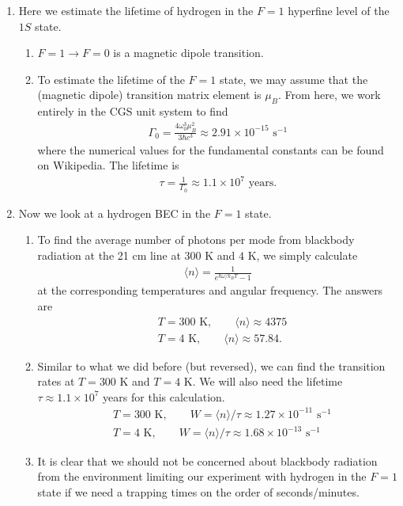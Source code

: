 \documentclass{article}
\theoremstyle{definition}
\newcommand{\f}[2]{\frac{#1}{#2}}
\begin{document}
\begin{enumerate}[label=(\alph*)]
	\item Here we estimate the lifetime of hydrogen in the $F=1$ hyperfine level of the $1S$ state. 
	
	\begin{enumerate}[label=(\roman*)]
		\item $F=1 \to F=0$ is a magnetic dipole transition. 
		
		\item To estimate the lifetime of the $F=1$ state, we may assume that the (magnetic dipole) transition matrix element is $\mu_B$. From here, we work entirely in the CGS unit system to find 
		\begin{align*}
		\Gamma_0 = \f{4\omega_0^3 \mu_B^2}{3\hbar c^3} \approx 2.91 \times 10^{-15} \text{ s}^{-1}
		\end{align*}
		where the numerical values for the fundamental constants can be found on Wikipedia. The lifetime is 
		\begin{align*}
		\tau = \f{1}{\Gamma_0} \approx 1.1 \times 10^7 \text{ years}.
		\end{align*}
		
		
	\end{enumerate}
	
	\item Now we look at a hydrogen BEC in the $F=1$ state. 
	
	\begin{enumerate}[label=(\roman*)]
		\item To find the average number of photons per mode from blackbody radiation at the 21 cm line at $300$ K and $4$ K, we simply calculate
		\begin{align*}
		\langle n \rangle = \f{1}{e^{\hbar \omega/k_B T} - 1}
		\end{align*}
		at the corresponding temperatures and angular frequency. The answers are
		\begin{align*}
		&T = 300 \text{ K}, \quad\quad \langle n \rangle \approx 4375 \\
		&T = 4 \text{ K}, \quad\quad \langle n \rangle \approx 57.84.
		\end{align*}
		
		\item Similar to what we did before (but reversed), we can find the transition rates at $T=300$ K and $T = 4$ K. We will also need the lifetime $\tau \approx 1.1 \times 10^7 $ years for this calculation.
		\begin{align*}
		&T = 300 \text{ K}, \quad\quad W = \langle n\rangle/\tau \approx 1.27\times 10^{-11} \text{ s}^{-1}\\
		&T = 4 \text{ K}, \quad\quad W = \langle n\rangle/\tau \approx  1.68 \times 10^{-13} \text{ s}^{-1}
		\end{align*}
		\item It is clear that we should not be concerned about blackbody radiation from the environment limiting our experiment with hydrogen in the $F=1$ state if we need a trapping times on the order of seconds/minutes. 


\end{enumerate}
\end{enumerate}
\end{document}
